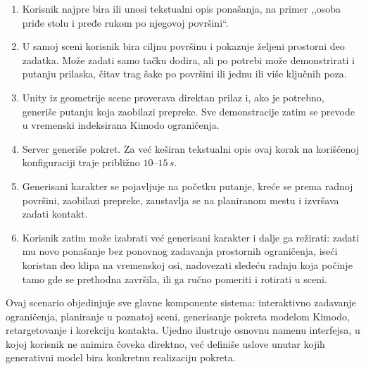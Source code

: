 \documentclass{article}
\begin{document}
\begin{enumerate}
    \item Korisnik najpre bira ili unosi tekstualni opis ponašanja, na primer ,,osoba priđe stolu i pređe rukom po njegovoj površini``.

    \item U samoj sceni korisnik bira ciljnu površinu i pokazuje željeni prostorni deo zadatka. Može zadati samo tačku dodira, ali po potrebi može demonstrirati i putanju prilaska, čitav trag šake po površini ili jednu ili više ključnih poza.

    \item Unity iz geometrije scene proverava direktan prilaz i, ako je potrebno, generiše putanju koja zaobilazi prepreke. Sve demonstracije zatim se prevode u vremenski indeksirana Kimodo ograničenja.

    \item Server generiše pokret. Za već keširan tekstualni opis ovaj korak na korišćenoj konfiguraciji traje približno $10$--$15\,s$.

    \item Generisani karakter se pojavljuje na početku putanje, kreće se prema radnoj površini, zaobilazi prepreke, zaustavlja se na planiranom mestu i izvršava zadati kontakt.

    \item Korisnik zatim može izabrati već generisani karakter i dalje ga režirati: zadati mu novo ponašanje bez ponovnog zadavanja prostornih ograničenja, iseći koristan deo klipa na vremenskoj osi, nadovezati sledeću radnju koja počinje tamo gde se prethodna završila, ili ga ručno pomeriti i rotirati u sceni.
\end{enumerate}

Ovaj scenario objedinjuje sve glavne komponente sistema: interaktivno zadavanje ograničenja, planiranje u poznatoj sceni, generisanje pokreta modelom Kimodo, retargetovanje i korekciju kontakta. Ujedno ilustruje osnovnu namenu interfejsa, u kojoj korisnik ne animira čoveka direktno, već definiše uslove unutar kojih generativni model bira konkretnu realizaciju pokreta.

\end{document}
